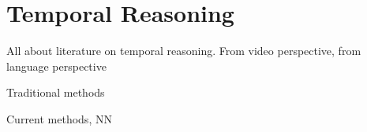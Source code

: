 \section{Temporal Reasoning}
\label{sec:tempreason}

All about literature on temporal reasoning. From video perspective, from
language perspective

Traditional methods
\cite{bruce1972temporalqa}
\cite{allen1983interval}
\cite{pustejovsky2003timeml}

Current methods, NN
\cite{zhou2021tracie}


%
%
%
%
